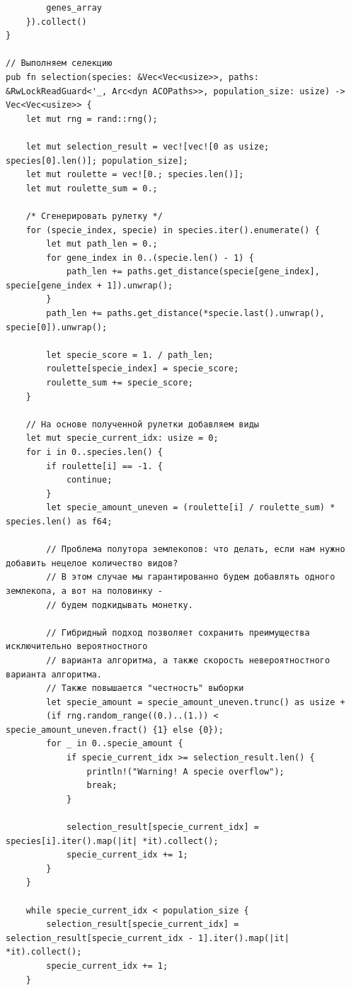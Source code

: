 \documentclass[a4paper,14pt]{extarticle}
\begin{document}
\begin{verbatim}
        genes_array
    }).collect()
}

// Выполняем селекцию
pub fn selection(species: &Vec<Vec<usize>>, paths: &RwLockReadGuard<'_, Arc<dyn ACOPaths>>, population_size: usize) -> Vec<Vec<usize>> {
    let mut rng = rand::rng();

    let mut selection_result = vec![vec![0 as usize; species[0].len()]; population_size];
    let mut roulette = vec![0.; species.len()];
    let mut roulette_sum = 0.;

    /* Сгенерировать рулетку */
    for (specie_index, specie) in species.iter().enumerate() {
        let mut path_len = 0.;
        for gene_index in 0..(specie.len() - 1) {
            path_len += paths.get_distance(specie[gene_index], specie[gene_index + 1]).unwrap();
        }
        path_len += paths.get_distance(*specie.last().unwrap(), specie[0]).unwrap();

        let specie_score = 1. / path_len;
        roulette[specie_index] = specie_score;
        roulette_sum += specie_score;
    }

    // На основе полученной рулетки добавляем виды
    let mut specie_current_idx: usize = 0;
    for i in 0..species.len() {
        if roulette[i] == -1. {
            continue;
        }
        let specie_amount_uneven = (roulette[i] / roulette_sum) * species.len() as f64;
        
        // Проблема полутора землекопов: что делать, если нам нужно добавить нецелое количество видов?
        // В этом случае мы гарантированно будем добавлять одного землекопа, а вот на половинку - 
        // будем подкидывать монетку.

        // Гибридный подход позволяет сохранить преимущества исключительно вероятностного
        // варианта алгоритма, а также скорость невероятностного варианта алгоритма. 
        // Также повышается "честность" выборки
        let specie_amount = specie_amount_uneven.trunc() as usize + 
        (if rng.random_range((0.)..(1.)) < specie_amount_uneven.fract() {1} else {0});
        for _ in 0..specie_amount {
            if specie_current_idx >= selection_result.len() {
                println!("Warning! A specie overflow");
                break;
            }

            selection_result[specie_current_idx] = species[i].iter().map(|it| *it).collect();
            specie_current_idx += 1;
        }
    }

    while specie_current_idx < population_size {
        selection_result[specie_current_idx] = selection_result[specie_current_idx - 1].iter().map(|it| *it).collect();
        specie_current_idx += 1;
    }


\end{verbatim}
\end{document}
